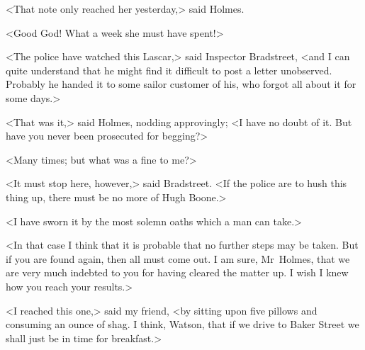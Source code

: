 <That note only reached her yesterday,> said Holmes.

<Good God! What a week she must have spent!>

<The police have watched this Lascar,> said Inspector Bradstreet, <and I can quite understand that he might find it difficult to post a letter unobserved. Probably he handed it to some sailor customer of his, who forgot all about it for some days.>

<That was it,> said Holmes, nodding approvingly; <I have no doubt of it. But have you never been prosecuted for begging?>

<Many times; but what was a fine to me?>

<It must stop here, however,> said Bradstreet. <If the police are to hush this thing up, there must be no more of Hugh Boone.>

<I have sworn it by the most solemn oaths which a man can take.>

<In that case I think that it is probable that no further steps may be taken. But if you are found again, then all must come out. I am sure, Mr~Holmes, that we are very much indebted to you for having cleared the matter up. I wish I knew how you reach your results.>

<I reached this one,> said my friend, <by sitting upon five pillows and consuming an ounce of shag. I think, Watson, that if we drive to Baker Street we shall just be in time for breakfast.>